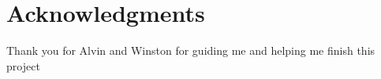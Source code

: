 \chapter*{Acknowledgments}\label{C:ack} 
Thank you for Alvin and Winston for guiding me and helping me finish this project